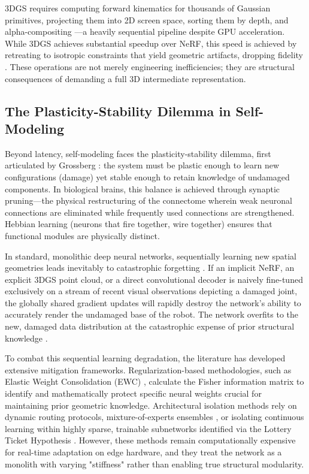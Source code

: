 \documentclass[12pt,a4paper,oneside]{report}
\begin{document}
3DGS requires computing forward kinematics for thousands of Gaussian primitives, projecting them into 2D screen space, sorting them by depth, and alpha-compositing \cite{kerbl20233d}—a heavily sequential pipeline despite GPU acceleration. While 3DGS achieves substantial speedup over NeRF, this speed is achieved by retreating to isotropic constraints that yield geometric artifacts, dropping fidelity \cite{hu2025learning}. These operations are not merely engineering inefficiencies; they are structural consequences of demanding a full 3D intermediate representation.

\subsection{The Plasticity-Stability Dilemma in Self-Modeling}

Beyond latency, self-modeling faces the plasticity-stability dilemma, first articulated by Grossberg \cite{grossberg1987competitive}: the system must be plastic enough to learn new configurations (damage) yet stable enough to retain knowledge of undamaged components. In biological brains, this balance is achieved through synaptic pruning—the physical restructuring of the connectome wherein weak neuronal connections are eliminated while frequently used connections are strengthened. Hebbian learning (neurons that fire together, wire together) ensures that functional modules are physically distinct.

In standard, monolithic deep neural networks, sequentially learning new spatial geometries leads inevitably to catastrophic forgetting \cite{mccloskey1989catastrophic, french1999catastrophic}. If an implicit NeRF, an explicit 3DGS point cloud, or a direct convolutional decoder is naively fine-tuned exclusively on a stream of recent visual observations depicting a damaged joint, the globally shared gradient updates will rapidly destroy the network's ability to accurately render the undamaged base of the robot. The network overfits to the new, damaged data distribution at the catastrophic expense of prior structural knowledge \cite{kirkpatrick2017overcoming}.

To combat this sequential learning degradation, the literature has developed extensive mitigation frameworks. Regularization-based methodologies, such as Elastic Weight Consolidation (EWC) \cite{kirkpatrick2017overcoming}, calculate the Fisher information matrix to identify and mathematically protect specific neural weights crucial for maintaining prior geometric knowledge. Architectural isolation methods rely on dynamic routing protocols, mixture-of-experts ensembles \cite{mocanu2018scalable}, or isolating continuous learning within highly sparse, trainable subnetworks identified via the Lottery Ticket Hypothesis \cite{frankle2018lottery}. However, these methods remain computationally expensive for real-time adaptation on edge hardware, and they treat the network as a monolith with varying "stiffness" rather than enabling true structural modularity.
\end{document}
